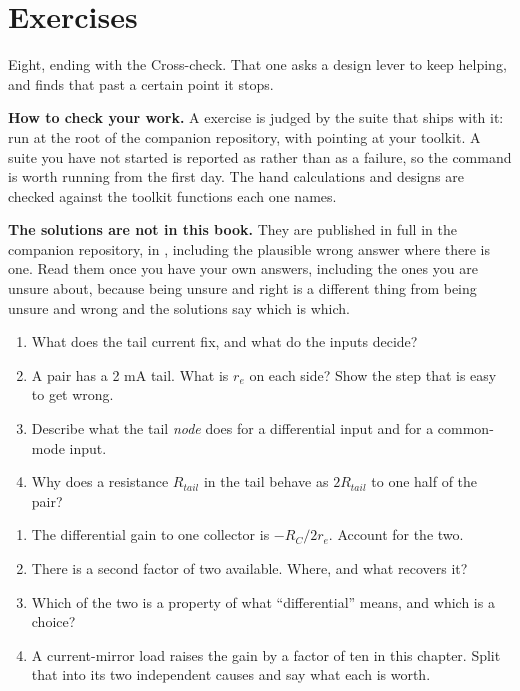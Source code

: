 
\section{Exercises}
\label{c9:sec:exercises}

Eight, ending with the Cross-check. That one asks a design lever to keep helping, and finds that past a certain point it stops.

\begin{aside}
\textbf{How to check your work.} A  exercise is judged by the suite that ships with it: run  at the root of the companion repository, with  pointing at your toolkit. A suite you have not started is reported as  rather than as a failure, so the command is worth running from the first day. The hand calculations and designs are checked against the toolkit functions each one names.

\textbf{The solutions are not in this book.} They are published in full in the companion repository, in , including the plausible wrong answer where there is one. Read them once you have your own answers, including the ones you are unsure about, because being unsure and right is a different thing from being unsure and wrong and the solutions say which is which.
\end{aside}

\label{c9:ex:1}
\begin{enumerate}
  \item What does the tail current fix, and what do the inputs decide?
  \item A pair has a 2 mA tail. What is $r_e$ on each side? Show the step that is easy to get wrong.
  \item Describe what the tail \emph{node} does for a differential input and for a common-mode input.
  \item Why does a resistance $R_{tail}$ in the tail behave as $2R_{tail}$ to one half of the pair?
\end{enumerate}

\label{c9:ex:2}
\begin{enumerate}
  \item The differential gain to one collector is $-R_C/2r_e$. Account for the two.
  \item There is a second factor of two available. Where, and what recovers it?
  \item Which of the two is a property of what ``differential'' means, and which is a choice?
  \item A current-mirror load raises the gain by a factor of ten in this chapter. Split that into its two independent causes and say what each is worth.
\end{enumerate}

